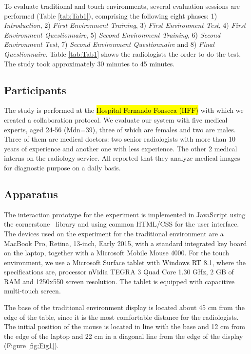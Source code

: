 \documentclass{sigchi}
\begin{document}
To evaluate traditional and touch environments, several evaluation sessions are  performed (Table \ref{tab:Tab1}), comprising the following eight phases: 1) \textit{Introduction}, 2) \textit{First Environment Training}, 3) \textit{First Environment Test}, 4) \textit{First Environment Questionnaire}, 5) \textit{Second Environment Training}, 6) \textit{Second Environment Test}, 7) \textit{Second Environment Questionnaire} and 8) \textit{Final Questionnaire}. Table \ref{tab:Tab1} shows the radiologists the order to do the test. The study took approximately 30 minutes to 45 minutes.

\subsection{Participants}

The study is performed at the \hl{Hospital Fernando Fonseca (HFF)} with which we created a collaboration protocol. We evaluate our system with five medical experts, aged 24-56 (Mdn=39), three of which are females and two are males. Three of them are medical doctors: two senior radiologists with more than 10 years of experience and another one  with less experience. The other 2 medical  interns on the radiology service. All reported that they analyze medical images for diagnostic purpose on a daily basis.

\subsection{Apparatus}

The interaction prototype for the experiment is implemented in JavaScript using the cornerstone~\cite{cornerstone} library and using common HTML/CSS for the user interface. The devices used on the experiment for the traditional environment are a MacBook Pro, Retina, 13-inch, Early 2015, with a standard integrated key board on the laptop, together with a Microsoft Mobile Mouse 4000. For the touch environment, we use a Microsoft Surface tablet with Windows RT 8.1, where the specifications are, processor nVidia TEGRA 3 Quad Core 1.30 GHz, 2 GB of RAM and 1250x550 screen resolution. The tablet is equipped with capacitive multi-touch screen.

The base of the traditional environment display is located about 45 cm from the edge of the table, since it is the most comfortable distance for the radiologists. The initial position of the mouse is located in line with the base and 12 cm from the edge of the laptop and 22 cm in a diagonal line from the edge of the display (Figure \ref{fig:Fig1}).
\end{document}

